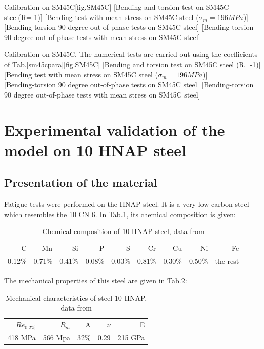 \begin{Figure}[!h]{Calibration on  SM45C}[fig.SM45C]
	[Bending and torsion test on SM45C steel(R=-1)]
	[Bending test with mean stress on SM45C steel ($\sigma_m=196 MPa$)]
	\\
	[Bending-torsion 90 degree out-of-phase tests on SM45C steel]
	[Bending-torsion 90 degree out-of-phase tests with mean stress on SM45C steel]
\end{Figure}

\begin{Figure}[!h]{Calibration on  SM45C. The numerical tests are carried out using the coefficients of Tab.\ref{sm45cpara}}[fig.SM45C]
[Bending and torsion test on SM45C steel (R=-1)]
[Bending test with mean stress on SM45C steel ($\sigma_m=196 MPa$)]
\\
[Bending-torsion 90 degree out-of-phase tests on SM45C steel]
[Bending-torsion 90 degree out-of-phase tests with mean stress on SM45C steel]
\end{Figure}


\clearpage
\section{Experimental validation of the model on 10 HNAP steel}
\subsection{Presentation of the material}
Fatigue tests were performed on the HNAP steel. It is a very low carbon steel
which resembles the 10 CN 6. In Tab.\ref{tab.10HNAPchem}, its chemical composition is given:	
\begin{table}[!h]
\centering
\begin{tabular}{rrrrrrrrr}
\hline
C      & Mn     & Si     & P      & S      & Cr     & Cu     & Ni     & Fe       \\
0.12\% & 0.71\% & 0.41\% & 0.08\% & 0.03\% & 0.81\% & 0.30\% & 0.50\% & the rest \\ \hline
\end{tabular}
\caption{Chemical composition of 10 HNAP steel, data from \cite{Bedkowski1994}}
\label{tab.10HNAPchem}
\end{table}
The mechanical properties of this steel are given in Tab.\ref{tab.10HNAPmec}:
\begin{table}[!h]
\centering
\begin{tabular}{rrrrr}
\hline
$Re_{0.2\%}$ & $R_m$   & A    & $\nu$ & E          \\
418 MPa     & 566 Mpa & 32\% & 0.29  & 215 GPa \\ \hline
\end{tabular}
\caption{Mechanical characteristics of steel 10 HNAP, data from \cite{Bedkowski1994}}
\label{tab.10HNAPmec}
\end{table}

